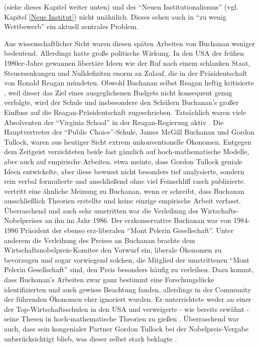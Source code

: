 (siehe dieses Kapitel weiter unten) und des "`Neuen Institutionalismus"' (vgl. Kapitel \ref{Neue Institut}) nicht unähnlich. Dieses sehen auch in "`zu wenig Wettbewerb"' ein aktuell zentrales Problem.

Aus wissenschaftlicher Sicht waren diesen späten Arbeiten von Buchanan weniger bedeutend. Allerdings hatte \textcite{Buchanan1978} große politische Wirkung. In den USA der frühen 1980er-Jahre gewannen libertäre Ideen wie der Ruf nach einem schlanken Staat, Steuersenkungen und Nulldefiziten enorm an Zulauf, die in der Präsidentschaft von Ronald Reagan mündeten. Obwohl Buchanan selbst Reagan heftig kritisierte \parencite[S. 177]{Romer1998}, weil dieser das Ziel eines ausgeglichenen Budgets nicht konsequent genug verfolgte, wird der Schule und insbesondere den Schülern Buchanan's großer Einfluss auf die Reagan-Präsidentschaft zugeschrieben. Tatsächlich waren viele Absolventen der "`Virginia School"' in der Reagan-Regierung aktiv \parencite[S. 96]{Warsh}. Die Hauptvertreter der "`Public Choice"'-Schule, James McGill Buchanan und Gordon Tullock, waren aus heutiger Sicht extrem unkonventionelle Ökonomen. Entgegen dem Zeitgeist verzichteten beide fast gänzlich auf hoch-mathematische Modelle, aber auch auf empirische Arbeiten. \textcite[S. 215]{Congleton2004} etwa meinte, dass Gordon Tullock geniale Ideen entwickelte, aber diese bewusst nicht besonders tief analysierte, sondern rein verbal formulierte und anschließend ohne viel Feinschliff rasch publizierte. \textcite[S. 178]{Romer1988} vertritt eine ähnliche Meinung zu Buchanan, wenn er schreibt, dass Buchanan ausschließlich Theorien erstellte und keine einzige empirische Arbeit verfasst.  Überraschend und auch sehr umstritten war die Verleihung des Wirtschafts-Nobelpreises an ihn im Jahr 1986. Der erzkonservative Buchanan war von 1984-1986 Präsident der ebenso erz-liberalen "`Mont Pelerin Gesellschaft"'. Unter anderem die Verleihung des Preises an Buchanan brachte dem Wirtschaftsnobelpreis-Komitee den Vorwurf ein, liberale Ökonomen zu bevorzugen und sogar vorwiegend solchen, die Mitglied der umstrittenen "`Mont Pelerin Gesellschaft"' sind, den Preis besonders häufig zu verleihen. Dazu kommt, dass Buchanan's Arbeiten zwar ganz bestimmt eine Forschungslücke identifizierten und auch gewisse Beachtung fanden, allerdings in der Community der führenden Ökonomen eher ignoriert wurden. Er unterrichtete weder an einer der Top-Wirtschaftsschulen in den USA und verweigerte - wie bereits erwähnt - seine Thesen in hoch-mathematische Theorien zu gießen \parencite[S. 173]{Pressman1999}. Überraschend war auch, dass sein kongenialer Partner Gordon Tullock bei der Nobelpreis-Vergabe unberücksichtigt blieb, was dieser selbst stark beklagte \parencite[S. 98]{Warsh}.

